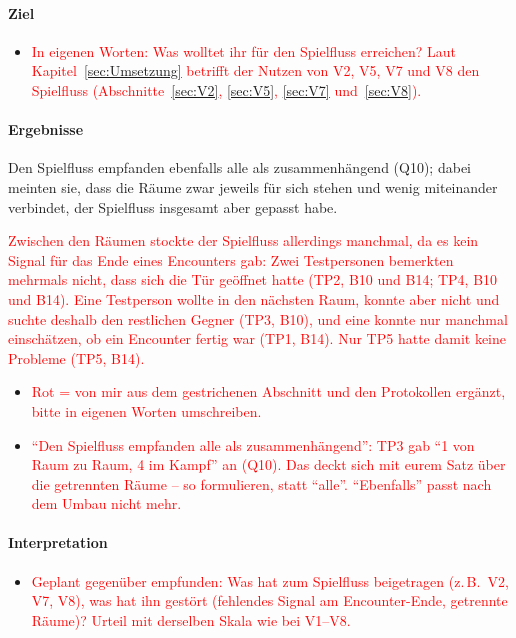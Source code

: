 \documentclass[../Main.tex]{subfiles}
\begin{document}
\paragraph{Ziel}
\begin{itemize}[leftmargin=1.5cm]
    \item \textcolor{red}{In eigenen Worten: Was wolltet ihr für den Spielfluss erreichen? Laut Kapitel~\ref{sec:Umsetzung} betrifft der Nutzen von V2, V5, V7 und V8 den Spielfluss (Abschnitte~\ref{sec:V2}, \ref{sec:V5}, \ref{sec:V7} und~\ref{sec:V8}).}
\end{itemize}

\paragraph{Ergebnisse}
Den Spielfluss empfanden ebenfalls alle als zusammenhängend (Q10); dabei meinten sie, dass die Räume zwar jeweils für sich stehen und wenig miteinander verbindet, der Spielfluss insgesamt aber gepasst habe.

\textcolor{red}{Zwischen den Räumen stockte der Spielfluss allerdings manchmal, da es kein Signal für das Ende eines Encounters gab: Zwei Testpersonen bemerkten mehrmals nicht, dass sich die Tür geöffnet hatte (TP2, B10 und B14; TP4, B10 und B14). Eine Testperson wollte in den nächsten Raum, konnte aber nicht und suchte deshalb den restlichen Gegner (TP3, B10), und eine konnte nur manchmal einschätzen, ob ein Encounter fertig war (TP1, B14). Nur TP5 hatte damit keine Probleme (TP5, B14).}

\begin{itemize}[leftmargin=1.5cm]
    \item \textcolor{red}{Rot = von mir aus dem gestrichenen Abschnitt und den Protokollen ergänzt, bitte in eigenen Worten umschreiben.}
    \item \textcolor{red}{\enquote{Den Spielfluss empfanden alle als zusammenhängend}: TP3 gab \enquote{1 von Raum zu Raum, 4 im Kampf} an (Q10). Das deckt sich mit eurem Satz über die getrennten Räume -- so formulieren, statt \enquote{alle}. \enquote{Ebenfalls} passt nach dem Umbau nicht mehr.}
\end{itemize}

\paragraph{Interpretation}
\begin{itemize}[leftmargin=1.5cm]
    \item \textcolor{red}{Geplant gegenüber empfunden: Was hat zum Spielfluss beigetragen (z.\,B.\ V2, V7, V8), was hat ihn gestört (fehlendes Signal am Encounter-Ende, getrennte Räume)? Urteil mit derselben Skala wie bei V1--V8.}
\end{itemize}
\end{document}
